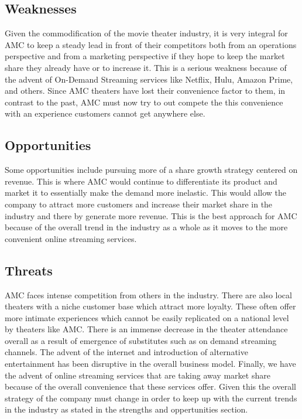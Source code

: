 \documentclass[12pt]{article}
\begin{document}
\subsection{Weaknesses} 

Given the commodification of the movie theater industry, it is very integral for AMC to keep a steady lead in front of their competitors both from an operations perspective and from a marketing perspective if they hope to keep the market share they already have or to increase it. This is a serious weakness because of the advent of On-Demand Streaming services like Netflix, Hulu, Amazon Prime, and others. Since AMC theaters have lost their convenience factor to them, in contrast to the past, AMC must now try to out compete the this convenience with an experience customers cannot get anywhere else.


\subsection{Opportunities}
Some opportunities include pursuing more of a share growth strategy centered on revenue. This is where AMC would continue to differentiate its product and market it to essentially make the demand more inelastic. This would allow the company to attract more customers and increase their market share in the industry and there by generate more revenue. This is the best approach for AMC because of the overall trend in the industry as a whole as it moves to the more convenient online streaming services. 


\subsection{Threats}

AMC faces intense competition from others in the industry. There are also local theaters with a niche customer base which attract more loyalty. These often offer more intimate experiences which cannot be easily replicated on a national level by theaters like AMC. There is an immense decrease in the theater attendance overall  as a result of emergence of substitutes such as on demand streaming channels. The advent of the internet and introduction of alternative entertainment has been disruptive in the overall business model. Finally, we have the advent of online streaming services that are taking away market share because of the overall convenience that these services offer. Given this the overall strategy of the company must change in order to keep up with the current trends in the industry as stated in the strengths and oppertunities section.
\end{document}

